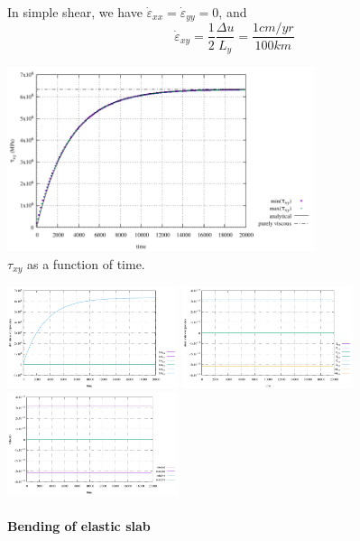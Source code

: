 In simple shear, we have $\dot{\varepsilon}_{xx}=\dot{\varepsilon}_{yy}=0$, and 
\[
\dot{\varepsilon}_{xy}=\frac{1}{2} \frac{\Delta u}{L_y} = \frac{1 cm/yr}{100km}
\]

\begin{center}
\includegraphics[width=9cm]{python_codes/fieldstone_64/results/buildup_12/tauxy}\\
{\captionfont $\tau_{xy}$ as a function of time.}
\end{center}

\includegraphics[width=5cm]{python_codes/fieldstone_64/results/buildup_12/tau}
\includegraphics[width=5cm]{python_codes/fieldstone_64/results/buildup_12/strainrate}
\includegraphics[width=5cm]{python_codes/fieldstone_64/results/buildup_12/velocity}\\




\paragraph{Bending of elastic slab}

